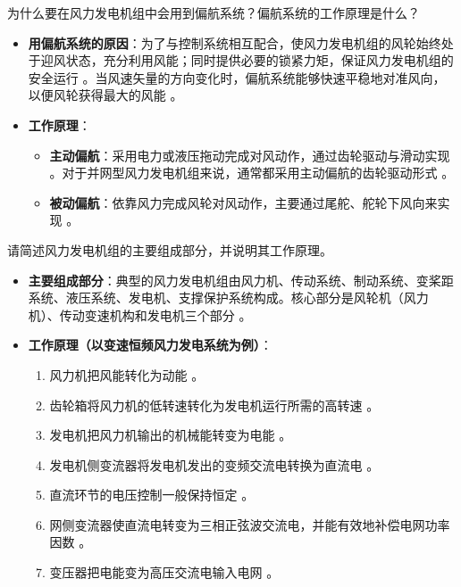 \begin{problem}\label{exer:think_03_wind_05}
为什么要在风力发电机组中会用到偏航系统？偏航系统的工作原理是什么？
\end{problem}

\begin{solution}
\begin{itemize}
\item \textbf{用偏航系统的原因}：为了与控制系统相互配合，使风力发电机组的风轮始终处于迎风状态，充分利用风能；同时提供必要的锁紧力矩，保证风力发电机组的安全运行 。当风速矢量的方向变化时，偏航系统能够快速平稳地对准风向，以便风轮获得最大的风能 。
\item \textbf{工作原理}：
\begin{itemize}
\item \textbf{主动偏航}：采用电力或液压拖动完成对风动作，通过齿轮驱动与滑动实现 。对于并网型风力发电机组来说，通常都采用主动偏航的齿轮驱动形式 。
\item \textbf{被动偏航}：依靠风力完成风轮对风动作，主要通过尾舵、舵轮下风向来实现 。
\end{itemize}
\end{itemize}
\end{solution}

\begin{problem}\label{exer:think_03_wind_06}
请简述风力发电机组的主要组成部分，并说明其工作原理。
\end{problem}

\begin{solution}
\begin{itemize}
\item \textbf{主要组成部分}：典型的风力发电机组由风力机、传动系统、制动系统、变桨距系统、液压系统、发电机、支撑保护系统构成。核心部分是风轮机（风力机）、传动变速机构和发电机三个部分 。
\item \textbf{工作原理（以变速恒频风力发电系统为例）}：
\begin{enumerate}
\item 风力机把风能转化为动能 。
\item 齿轮箱将风力机的低转速转化为发电机运行所需的高转速 。
\item 发电机把风力机输出的机械能转变为电能 。
\item 发电机侧变流器将发电机发出的变频交流电转换为直流电 。
\item 直流环节的电压控制一般保持恒定 。
\item 网侧变流器使直流电转变为三相正弦波交流电，并能有效地补偿电网功率因数 。
\item 变压器把电能变为高压交流电输入电网 。
\end{enumerate}
\end{itemize}
\end{solution}

